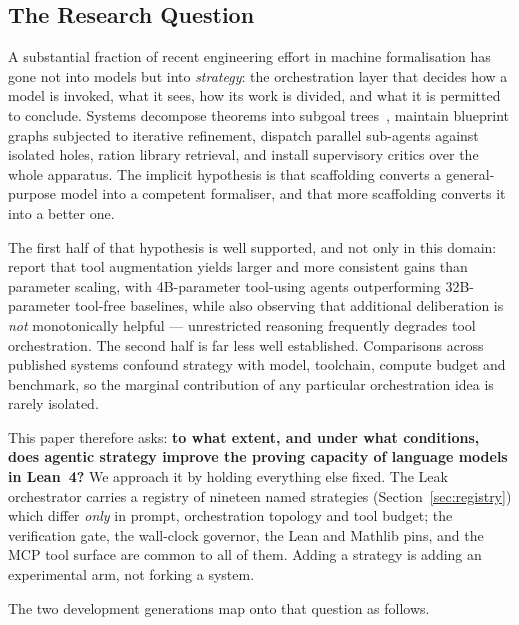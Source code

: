 \documentclass[12pt, a4paper]{article}
\begin{document}
\subsection{The Research Question}
\label{sec:research-question}

A substantial fraction of recent engineering effort in machine formalisation
has gone not into models but into \emph{strategy}: the orchestration layer
that decides how a model is invoked, what it sees, how its work is divided,
and what it is permitted to conclude. Systems decompose theorems into
subgoal trees~\cite{deepseekproverv2, davis2025goedelspoetry}, maintain
blueprint graphs subjected to iterative refinement, dispatch parallel
sub-agents against isolated holes, ration library retrieval, and install
supervisory critics over the whole apparatus. The implicit hypothesis is
that scaffolding converts a general-purpose model into a competent
formaliser, and that more scaffolding converts it into a better one.

The first half of that hypothesis is well supported, and not only in this
domain: \textcite{zywot2025smallagents} report that tool augmentation yields
larger and more consistent gains than parameter scaling, with 4B-parameter
tool-using agents outperforming 32B-parameter tool-free baselines, while also
observing that additional deliberation is \emph{not} monotonically helpful ---
unrestricted reasoning frequently degrades tool orchestration. The second
half is far less well established. Comparisons across published systems
confound strategy with model, toolchain, compute budget and benchmark, so
the marginal contribution of any particular orchestration idea is rarely
isolated.

This paper therefore asks: \textbf{to what extent, and under what
conditions, does agentic strategy improve the proving capacity of language
models in Lean~4?} We approach it by holding everything else fixed. The
Leak orchestrator carries a registry of nineteen named strategies
(Section~\ref{sec:registry}) which differ \emph{only} in prompt,
orchestration topology and tool budget; the verification gate, the
wall-clock governor, the Lean and Mathlib pins, and the MCP tool surface are
common to all of them. Adding a strategy is adding an experimental arm, not
forking a system.

The two development generations map onto that question as follows.
\end{document}
